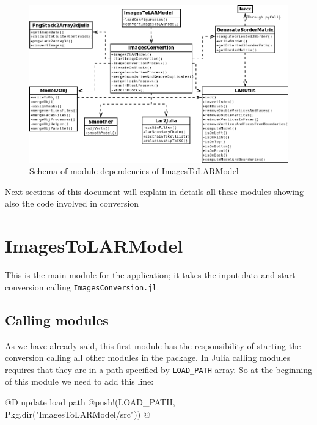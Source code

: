 \documentclass[11pt,oneside]{article}	%
\begin{document}
\begin{figure}[htb]
  \begin{center}
    \includegraphics[width=16cm]{images/architecture.png}
  \end{center}
  \caption{Schema of module dependencies of ImagesToLARModel}
  \label{fig:architecture}
\end{figure}


Next sections of this document will explain in details all these modules showing also the code involved in conversion


\section{ImagesToLARModel}\label{sec:ImagesToLARModel}

This is the main module for the application; it takes the input data and start conversion calling \texttt{ImagesConversion.jl}.

\subsection{Calling modules}\label{sec:modules}

As we have already said, this first module has the responsibility of starting the conversion calling all other modules in the package. In Julia calling modules requires that they are in a path specified by \texttt{LOAD\_PATH} array.
So at the beginning of this module we need to add this line:

@D update load path
@{push!(LOAD_PATH, Pkg.dir("ImagesToLARModel/src"))
@}
\end{document}
